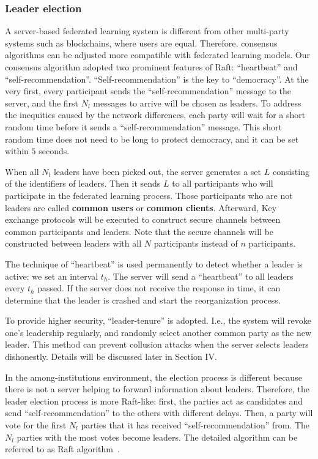 \subsubsection{\textbf{Leader election}}
A server-based federated learning system is different from other multi-party systems such as blockchains, where users are equal. Therefore, consensus algorithms can be adjusted more compatible with federated learning models. Our consensus algorithm adopted two prominent features of Raft: ``heartbeat'' and ``self-recommendation''. ``Self-recommendation'' is the key to ``democracy''. At the very first, every participant sends the ``self-recommendation'' message to the server, and the first $N_l$ messages to arrive will be chosen as leaders. To address the inequities caused by the network differences, each party will wait for a short random time before it sends a ``self-recommendation'' message. This short random time does not need to be long to protect democracy, and it can be set within $5$ seconds. 

When all $N_l$ leaders have been picked out, the server generates a set $L$ consisting of the identifiers of leaders. Then it sends $L$ to all participants who will participate in the federated learning process. Those participants who are not leaders are called \textbf{common users} or \textbf{common clients}. Afterward, Key exchange protocols will be executed to construct secure channels between common participants and leaders. Note that the secure channels will be constructed between leaders with all $N$ participants instead of $n$ participants.

The technique of ``heartbeat'' is used permanently to detect whether a leader is active: we set an interval $t_h$. The server will send a ``heartbeat'' to all leaders every $t_h$ passed. If the server does not receive the response in time, it can determine that the leader is crashed and start the reorganization process.

To provide higher security, ``leader-tenure'' is adopted. I.e., the system will revoke one's leadership regularly, and randomly select another common party as the new leader. This method can prevent collusion attacks when the server selects leaders dishonestly. Details will be discussed later in Section IV. 

In the among-institutions environment, the election process is different because there is not a server helping to forward information about leaders. Therefore, the leader election process is more Raft-like: first, the parties act as candidates and send ``self-recommendation'' to the others with different delays. Then, a party will vote for the first $N_l$ parties that it has received ``self-recommendation'' from. The $N_l$ parties with the most votes become leaders. The detailed algorithm can be referred to as Raft algorithm~\cite{Raft}.

